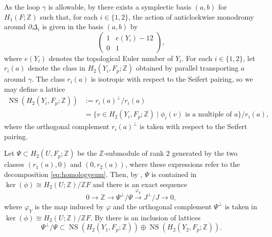 \documentclass[a4paper]{amsart}
\theoremstyle{definition}
\theoremstyle{plain}
\theoremstyle{remark}
\newcommand{\bZ}{\mathbb{Z}}
\DeclareMathOperator{\NS}{NS}
\numberwithin{figure}{section}
\numberwithin{table}{section}
\begin{document}
As the loop $\gamma$ is allowable, by \cite[Definition 4.11]{dfk3slpms} there exists a symplectic basis $(a,b)$ for $H_1(F;\bZ)$ such that, for each $i \in \{1,2\}$, the action of anticlockwise monodromy around $\partial \Delta_i$ is given in the basis $(a,b)$ by
\begin{equation}\label{eq:monodromy} \begin{pmatrix} 1 & e(Y_i) - 12 \\ 0 & 1 \end{pmatrix},\end{equation}
where $e(Y_i)$ denotes the topological Euler number of $Y_i$. For each $i \in \{1,2\}$, let $r_i(a)$ denote the class in $H_2(Y_i,F_p;\bZ)$ obtained by parallel transporting $a$ around $\gamma$. The class $r_i(a)$ is isotropic with respect to the Seifert pairing, so we may define a lattice
\begin{align*}\NS(H_2(Y_i,F_p;\bZ)) &:= r_i(a)^{\perp}/r_i(a)\\ 
&= \{v \in H_2(Y_i,F_p;\bZ) \mid \phi_i(v) \text{ is a multiple of } a\}/r_i(a),\end{align*}
where the orthogonal complement $r_i(a)^{\perp}$ is taken with respect to the Seifert pairing.

Let $\Psi \subset H_2(U,F_p;\bZ)$ be the $\bZ$-submodule of rank $2$ generated by the two classes $(r_1(a),0)$ and $(0,r_2(a))$, where these expressions refer to the decomposition \eqref{eq:homologysum}. Then, by \cite[Proposition 4.20]{dfk3slpms}, $\Psi$ is contained in $\ker(\phi) \cong H_2(U;\bZ)/\bZ F$ and there is an exact sequence
\[0 \longrightarrow \bZ \longrightarrow \Psi^{\perp}/\Psi \stackrel{\varphi_Y}{\longrightarrow} J^{\perp}/J \longrightarrow 0,\]
where $\varphi_Y$ is the map induced by $\varphi$ and the orthogonal complement $\Psi^{\perp}$ is taken in $\ker(\phi) \cong H_2(U;\bZ)/\bZ F$. By \cite[Proposition 2.28]{dfk3slpms} there is an inclusion of lattices
\[\Psi^{\perp}/\Psi \subset \NS(H_2(Y_1,F_p;\bZ)) \oplus \NS(H_2(Y_2,F_p;\bZ)).\]
\end{document}
